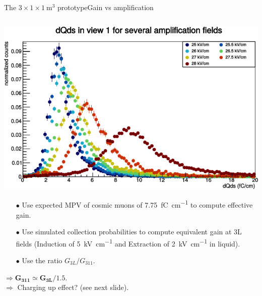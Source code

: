 \documentclass[10pt]{beamer}
\begin{document}
    
    \begin{frame}{The \texorpdfstring{$3 \times 1 \times \SI{1}{\meter\cubed}$}{311} prototype}{Gain vs amplification}
    	\begin{scriptsize}
	    	\begin{columns}
	    		\begin{column}{0.5\textwidth}
	    			\includegraphics[width=\textwidth]{figures/311/dQds_gain.png}\\
	    			\vfill
	    			\begin{itemize}
	    				\item[$\bullet$] Use expected MPV of cosmic muons of \SI{7.75}{\femto\coulomb\per\centi\meter} to compute effective gain.
	    				\item[$\bullet$] Use simulated collection probabilities to compute equivalent gain at 3L fields (Induction of \SI{5}{\kilo\volt\per\centi\meter} and Extraction of \SI{2}{\kilo\volt\per\centi\meter} in liquid).
	    				\item[$\bullet$] Use the ratio $G_{3L}/G_{311}$.
	    			\end{itemize}
	    			$\mathbf{\Rightarrow G_{311} \boldsymbol{\simeq} G_{3L}/1.5}$.\\
	    			$\Rightarrow$ Charging up effect? (see next slide).\\

\end{column}
\end{columns}
\end{scriptsize}
\end{frame}
\end{document}
